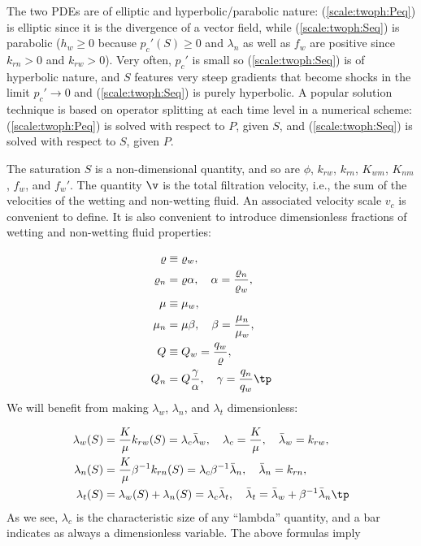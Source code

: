 \documentclass[graybox,envcountchap,sectrefs,final]{svmonodo}
\begin{document}
The two PDEs are of elliptic and hyperbolic/parabolic nature:
(\ref{scale:twoph:Peq}) is elliptic since it is the divergence of a
vector field, while (\ref{scale:twoph:Seq}) is parabolic ($h_w\geq 0$
because $p_c'(S)\geq 0$ and $\lambda_n$ as well as $f_w$ are positive
since $k_{rn}>0$ and $k_{rw}>0$). Very often, $p_c'$ is small so
(\ref{scale:twoph:Seq}) is of hyperbolic nature, and $S$ features very
steep gradients that become shocks in the limit $p_c'\rightarrow 0$
and (\ref{scale:twoph:Seq}) is purely hyperbolic.
A popular solution technique is based on operator splitting at each
time level in a numerical scheme:
(\ref{scale:twoph:Peq}) is solved with respect to $P$, given $S$, and
(\ref{scale:twoph:Seq}) is solved with respect to $S$, given $P$.

The saturation $S$ is a non-dimensional quantity, and so are $\phi$,
$k_{rw}$, $k_{rn}$, $K_{wm}$, $K_{nm}$, $f_w$, and $f_w'$.
The quantity $\v$ is the total filtration velocity, i.e., the
sum of the velocities of the wetting and non-wetting fluid.
An associated velocity scale $v_c$ is convenient to define.
It is also convenient to introduce dimensionless fractions of
wetting and non-wetting fluid properties:

\begin{align*}
\varrho &\equiv \varrho_w,\\ 
\varrho_n &= \varrho\alpha,\quad \alpha = \frac{\varrho_n}{\varrho_w},\\ 
\mu &\equiv\mu_w,\\ 
\mu_n &= \mu\beta,\quad \beta = \frac{\mu_n}{\mu_w},\\ 
Q &\equiv Q_w = \frac{q_w}{\varrho},\\ 
Q_n &= Q\frac{\gamma}{\alpha},\quad \gamma = \frac{q_n}{q_w}\tp
\end{align*}
We will benefit from making $\lambda_w$, $\lambda_n$, and $\lambda_t$
dimensionless:

\begin{align*}
\lambda_w(S) &= \frac{K}{\mu}k_{rw}(S) = \lambda_c\bar\lambda_w,\quad
\lambda_c=\frac{K}{\mu},\quad \bar\lambda_w = k_{rw},\\ 
\lambda_n(S) &= \frac{K}{\mu}\beta^{-1}k_{rn}(S) = \lambda_c\beta^{-1}\bar\lambda_n,
\quad\bar\lambda_n = k_{rn},\\ 
\lambda_t(S) &= \lambda_w(S) + \lambda_n(S) = \lambda_c\bar\lambda_t,\quad
\bar\lambda_t = \bar \lambda_w +
\beta^{-1}\bar\lambda_n\tp
\end{align*}
As we see, $\lambda_c$ is the characteristic size of any ``lambda''
quantity, and a bar indicates as always a dimensionless variable.
The above formulas imply
\end{document}
